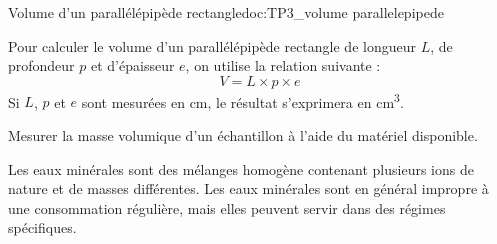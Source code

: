 \begin{doc}{Volume d'un parallélépipède rectangle}{doc:TP3_volume parallelepipede}
  \begin{multicols}{2}
    Pour calculer le volume d'un parallélépipède rectangle de longueur $L$, de profondeur $p$ et d’épaisseur $e$, on utilise la relation suivante :
    \begin{equation*}
      V = L \times p \times e
    \end{equation*}
    Si $L$, $p$ et $e$ sont mesurées en \unit{\cm}, le résultat s’exprimera en \unit{\cubic\cm}.

    \centering
  \end{multicols}
\end{doc}

\mesure Mesurer la masse volumique d'un échantillon à l'aide du matériel disponible.




\begin{encart}
  Les eaux minérales sont des mélanges homogène contenant plusieurs ions de nature et de masses différentes.
  Les eaux minérales sont en général impropre à une consommation régulière, mais elles peuvent servir dans des régimes spécifiques.
  
\end{encart}



